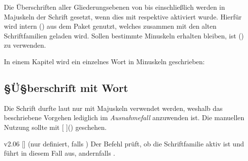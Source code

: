 %
Die Überschriften aller Gliederungsebenen von  bis einschließlich 
 werden in Majuskeln der Schrift \DIN gesetzt, wenn dies 
mit  respektive  aktiviert 
wurde. Hierfür wird intern () aus 
dem Paket  genutzt, welches zusammen mit den alten 
Schriftfamilien geladen wird. Sollen bestimmte Minuskeln erhalten bleiben, ist 
() zu verwenden.
%
\begin{Example}
In einem Kapitel wird ein einzelnes Wort in Minuskeln geschrieben:
\begin{Code}[escapechar=§]
\chapter{§Ü§berschrift mit  Wort}
\end{Code}
\end{Example}
%
Die Schrift \DIN durfte laut \CD nur mit Majuskeln verwendet werden, weshalb 
das beschriebene Vorgehen lediglich im \emph{Ausnahmefall} anzuwenden ist. 
Die manuellen Nutzung sollte mit 
[%
]() geschehen.

\begin{Obsolete}{v2.06}{%
  []
}(nur definiert, falls )
\printdeclarationlist%
%
Der Befehl  prüft, ob die Schriftfamilie \DIN aktiv ist und führt 
in diesem Fall  aus, andernfalls . 
\end{Obsolete}

